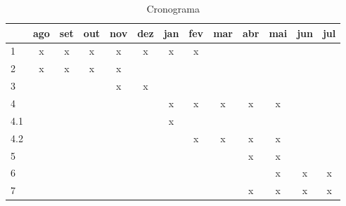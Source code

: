 \documentclass[
	12pt,				%
	openany,
	oneside,
	a4paper,			%
	english,			%
	brazil,				%
	]{abntex2}
\begin{document}
\begin{table}[H]
\caption{Cronograma}
\centering
	\begin{tabular}{|l||c|c|c|c|c|c|c|c|c|c|c|c|}
		\hline 
		   &ago&set&out&nov&dez&jan&fev&mar&abr&mai&jun&jul\\
		\hline 
		1  & x & x & x & x & x & x & x &  &  &  &  &  \\ 
		2  & x & x & x & x &  &  &  &  &  &  &  &  \\ 
		3  &  &  &  & x & x &  &  &  &  &  &  &  \\ 
		4  &  &  &  &  &  & x & x & x & x & x &  &  \\ 
		4.1  &  &  &  &  &  & x &  &  &  &  &  &  \\ 
		4.2  &  &  &  &  &  &  & x & x & x & x &  &  \\ 
		5 &  &  &  &  &  &  &  &  & x & x &  &  \\ 
		6  &  &  &  &  &  &  &  &  &  & x & x & x \\ 
		7 &  &  &  &  &  &  &  &  & x & x & x & x \\ 
		\hline 
	\end{tabular} 
\label{tab:cronograma}
\end{table}


\end{document}
